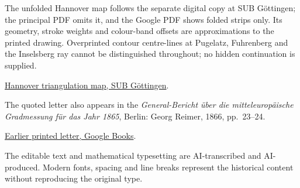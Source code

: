 The unfolded Hannover map follows the separate digital copy at
SUB Göttingen; the principal PDF omits it, and the Google PDF shows
folded strips only. Its geometry, stroke weights and colour-band offsets
are approximations to the printed drawing. Overprinted contour
centre-lines at Pugelatz, Fuhrenberg and the Inselsberg ray cannot be
distinguished throughout; no hidden continuation is supplied.\par
\noindent\href{https://webdoc.sub.gwdg.de/ebook/e/2005/gausscd/html/kapitel_landv_karte.htm}{Hannover triangulation map, SUB Göttingen}.

The quoted letter also appears in the \textit{General-Bericht über die
mitteleuropäische Gradmessung für das Jahr 1865}, Berlin: Georg Reimer,
1866, pp.~23--24.\par
\noindent\href{https://books.google.com/books?id=VBNDAAAAcAAJ\&pg=PA24}{Earlier printed letter, Google Books}.

The editable text and mathematical typesetting are AI-transcribed
and AI-produced. Modern fonts, spacing and line breaks represent
the historical content without reproducing the original type.

\par\endgroup
